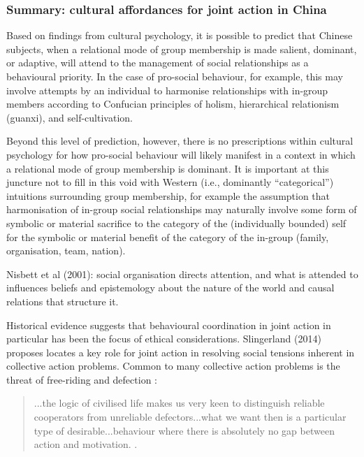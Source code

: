 \begin{CJK}{UTF8}{gbsn}
\subsubsection{Summary: cultural affordances for joint action in China}

Based on findings from cultural psychology, it is possible to predict that Chinese subjects, when a relational mode of group membership is made salient, dominant, or adaptive, will attend to the management of social relationships as a behavioural priority.  In the case of pro-social behaviour, for example, this may involve attempts by an individual to harmonise relationships with in-group members according to Confucian principles of holism, hierarchical relationism (guanxi), and self-cultivation.


Beyond this level of prediction, however, there is no prescriptions within cultural psychology for how pro-social behaviour will likely manifest in a context in which a relational mode of group membership is dominant.  It is important at this juncture not to fill in this void with Western (i.e., dominantly ``categorical'') intuitions surrounding group membership, for example the assumption that harmonisation of in-group social relationships may naturally involve some form of symbolic or material sacrifice to the category of the (individually bounded) self for the symbolic or material benefit of the category of the in-group (family, organisation, team, nation).


Nisbett et al (2001): social organisation directs attention, and what is attended to influences beliefs and epistemology about the nature of the world and causal relations that structure it.





Historical evidence suggests that behavioural coordination in joint action in particular has been the focus of ethical considerations.  Slingerland (2014) proposes locates a key role for joint action in resolving social tensions inherent in collective action problems.  Common to many collective action problems is the threat of free-riding and defection \citep{Cosmides2013}:

\begin{quotation}
   ...the logic of civilised life makes us very keen to distinguish reliable cooperators from unreliable defectors...what we want then is a particular type of desirable...behaviour where there is absolutely no gap between action and motivation.  \citep[192]{Slingerland2014}.
\end{quotation}


\end{CJK}
